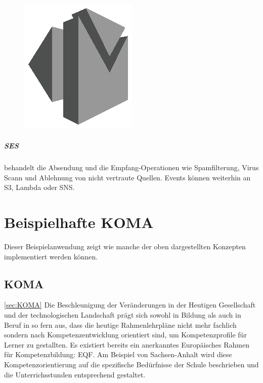 \documentclass[
12pt,
english,
ngerman,
headsepline,
twoside,
openright,
numbers=noenddot,version=first
]{scrreprt}
\begin{document}
\begin{figure}
	\includegraphics[width=0.9\linewidth]{./pics/aws/Messaging_GRAYSCALE_AmazonSES.eps}
\end{figure}
\paragraph{\acrfull{SES}} behandelt die Absendung und die Empfang-Operationen wie Spamfilterung, Virus Scann und Ablehnung von nicht vertraute Quellen. Events können weiterhin an \acrshort{S3}, Lambda oder \acrshort{SNS}.

\chapter{Beispielhafte KOMA}

Dieser Beispielanwendung zeigt wie manche der oben dargestellten Konzepten implementiert werden können.

\section{KOMA}
\label{sec:KOMA} \autoref{sec:KOMA}
Die Beschleunigung der Veränderungen in der Heutigen Gesellschaft und der technologischen Landschaft prägt sich sowohl in Bildung als auch in Beruf in so fern aus, dass die heutige Rahmenlehrpläne nicht mehr fachlich sondern nach Kompetenzentwicklung orientiert sind, um Kompetenzprofile für Lerner zu gestallten. Es existiert bereits ein anerkanntes Europäisches Rahmen für Kompetenzbildung: \acrfull{EQF}. Am Beispiel von Sachsen-Anhalt\cite{BildungsServerSachsen} wird diese Kompetenzorientierung auf die spezifische Bedürfnisse der Schule beschrieben und die Unterrichsstunden entsprechend gestaltet.
\end{document}

